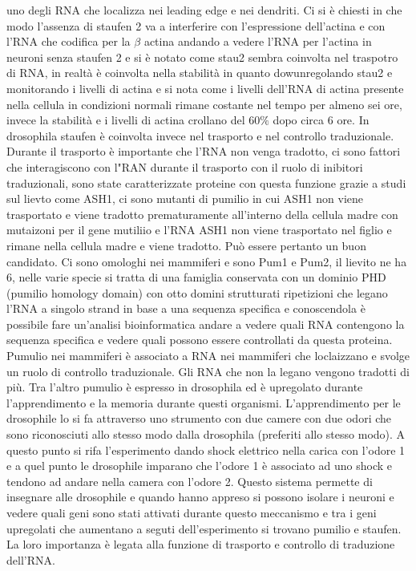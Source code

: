 uno degli RNA che localizza nei leading edge e nei dendriti. Ci si \`e chiesti in che modo l'assenza di staufen 2 va a interferire con l'espressione dell'actina e con l'RNA che codifica
per la $\beta$ actina andando a vedere l'RNA per l'actina in neuroni senza staufen 2 e si \`e notato come stau2 sembra coinvolta nel traspotro di RNA, in realt\`a \`e coinvolta nella
stabilit\`a in quanto dowunregolando stau2 e monitorando i livelli di actina e si nota come i livelli dell'RNA di actina presente nella cellula in condizioni normali rimane costante nel
tempo per almeno sei ore, invece la stabilit\`a e i livelli di actina crollano del $60\%$ dopo circa $6$ ore. In drosophila staufen \`e coinvolta invece nel trasporto e nel controllo
traduzionale. Durante il trasporto \`e importante che l'RNA non venga tradotto, ci sono fattori che interagiscono con l"RAN durante il trasporto con il ruolo di inibitori traduzionali, 
sono state caratterizzate proteine con questa funzione grazie a studi sul lievto come ASH1, ci sono mutanti di pumilio in cui ASH1 non viene trasportato e viene tradotto prematuramente 
all'interno della cellula madre con mutaizoni per il gene mutiliio e l'RNA ASH1 non viene trasportato nel figlio e rimane nella cellula madre e viene tradotto. Pu\`o essere pertanto 
un buon candidato. Ci sono omologhi nei mammiferi e sono Pum1 e Pum2, il lievito ne ha 6, nelle varie specie si tratta di una famiglia conservata con un dominio PHD (pumilio homology 
domain) con otto domini strutturati ripetizioni che legano l'RNA a singolo strand in base a una sequenza specifica e conoscendola \`e possibile fare un'analisi bioinformatica andare a 
vedere quali RNA contengono la sequenza specifica e vedere quali possono essere controllati da questa proteina. Pumulio nei mammiferi \`e associato a RNA nei mammiferi che loclaizzano
e svolge un ruolo di controllo traduzionale. Gli RNA che non la legano vengono tradotti di pi\`u. Tra l'altro pumulio \`e espresso in drosophila ed \`e upregolato durante l'apprendimento
e la memoria durante questi organismi. L'apprendimento per le drosophile lo si fa attraverso uno strumento con due camere con due odori che sono riconosciuti allo stesso modo dalla 
drosophila (preferiti allo stesso modo). A questo punto si rifa l'esperimento dando shock elettrico nella carica con l'odore 1 e a quel punto le drosophile imparano che l'odore 1 \`e 
associato ad uno shock e tendono ad andare nella camera con l'odore 2. Questo sistema permette di insegnare alle drosophile e quando hanno appreso si possono isolare i neuroni e vedere 
quali geni sono stati attivati durante questo meccanismo e tra i geni upregolati che aumentano a seguti dell'esperimento si trovano pumilio e staufen. La loro importanza \`e legata alla
funzione di trasporto e controllo di traduzione dell'RNA. 
